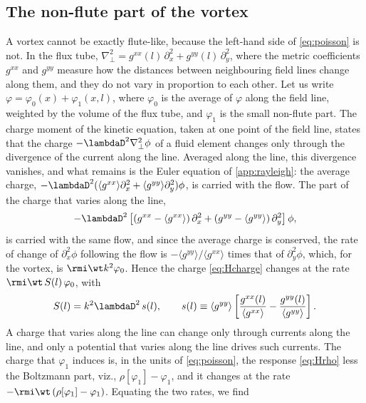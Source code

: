 \subsection{The non-flute part of the vortex}

A vortex cannot be exactly flute-like, because the left-hand side of \cref{eq:poisson} is not. In the flux tube, \(\nabla_\perp^2 = g^{xx}(l)\,\partial_x^2 + g^{yy}(l)\,\partial_y^2\), where the metric coefficients \(g^{xx}\) and \(g^{yy}\) measure how the distances between neighbouring field lines change along them, and they do not vary in proportion to each other. Let us write \(\varphi = \varphi_0(x) + \varphi_1(x, l)\), where \(\varphi_0\) is the average of \(\varphi\) along the field line, weighted by the volume of the flux tube, and \(\varphi_1\) is the small non-flute part. The charge moment of the kinetic equation, taken at one point of the field line, states that the charge \(-\lambdaD^2\nabla_\perp^2\phi\) of a fluid element changes only through the divergence of the current along the line. Averaged along the line, this divergence vanishes, and what remains is the Euler equation of \cref{app:rayleigh}: the average charge, \(-\lambdaD^2(\langle g^{xx}\rangle\partial_x^2 + \langle g^{yy}\rangle\partial_y^2)\phi\), is carried with the flow. The part of the charge that varies along the line,
\begin{equation}
-\lambdaD^2\left[\left(g^{xx} - \langle g^{xx}\rangle\right)\partial_x^2 + \left(g^{yy} - \langle g^{yy}\rangle\right)\partial_y^2\right]\phi,
\label{eq:Hcharge}
\end{equation}
is carried with the same flow, and since the average charge is conserved, the rate of change of \(\partial_x^2\phi\) following the flow is \(-\langle g^{yy}\rangle/\langle g^{xx}\rangle\) times that of \(\partial_y^2\phi\), which, for the vortex, is \(\rmi\wt k^2\varphi_0\). Hence the charge \cref{eq:Hcharge} changes at the rate \(\rmi\wt\,S(l)\,\varphi_0\), with
\begin{equation}
S(l) = k^2\lambdaD^2\,s(l),
\qquad
s(l) \equiv \langle g^{yy}\rangle\left[\frac{g^{xx}(l)}{\langle g^{xx}\rangle} - \frac{g^{yy}(l)}{\langle g^{yy}\rangle}\right].
\label{eq:Hsource}
\end{equation}
A charge that varies along the line can change only through currents along the line, and only a potential that varies along the line drives such currents. The charge that \(\varphi_1\) induces is, in the units of \cref{eq:poisson}, the response \cref{eq:Hrho} less the Boltzmann part, viz., \(\rho[\varphi_1] - \varphi_1\), and it changes at the rate \(-\rmi\wt\,(\rho[\varphi_1] - \varphi_1)\). Equating the two rates, we find
